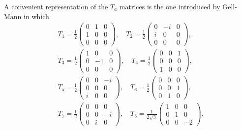 A convenient representation of the $T_a$ matrices is the one introduced by Gell-Mann \cite{GMM} in which
\begin{align}
&T_1=\frac{1}{2}\left(\begin{array}{ccc}
0&1&0\\1&0&0\\0&0&0
\end{array}\right),\quad T_2=\frac{1}{2}\left(\begin{array}{ccc}
0&-i&0\\i&0&0\\0&0&0
\end{array}\right),\nonumber\\
&T_3=\frac{1}{2}\left(\begin{array}{ccc}
1&0&0\\0&-1&0\\0&0&0
\end{array}\right),\quad T_4=\frac{1}{2}\left(\begin{array}{ccc}
0&0&1\\0&0&0\\1&0&0
\end{array}\right),\nonumber\\
&T_5=\frac{1}{2}\left(\begin{array}{ccc}
0&0&-i\\0&0&0\\i&0&0
\end{array}\right),\quad T_6=\frac{1}{2}\left(\begin{array}{ccc}
0&0&0\\0&0&1\\0&1&0
\end{array}\right),\nonumber\\
&T_7=\frac{1}{2}\left(\begin{array}{ccc}
0&0&0\\0&0&-i\\0&i&0
\end{array}\right),\quad T_8=\frac{1}{2\sqrt{3}}\left(\begin{array}{ccc}
1&0&0\\0&1&0\\0&0&-2
\end{array}\right).
\end{align}

